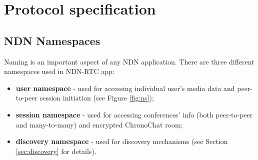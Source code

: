 \documentclass[12pt]{article}
\begin{document}
%
%
%
%

\section{Protocol specification}
\subsection{NDN Namespaces}

Naming is an important aspect of any NDN application. There are three different namespaces used in NDN-RTC app: 
\begin{itemize}
\item \textbf{user namespace} - used for accessing individual user's media data and peer-to-peer session initiation (see Figure \ref{fig:ns});
\item \textbf{session namespace} - used for accessing conferences' info (both peer-to-peer and many-to-many) and encrypted ChronoChat room;
\item \textbf{discovery namespace} - used for discovery mechanisms (see Section \ref{sec:discovery} for details).
\end{itemize} 
\end{document}
